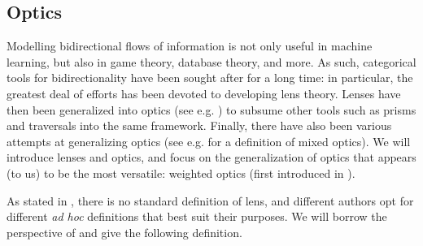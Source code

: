 \documentclass[12pt,a4paper,openright,twoside]{report}
\theoremstyle{plain}
\theoremstyle{definition}
\begin{document}
\subsection{Optics}

Modelling bidirectional flows of information is not only useful in machine learning, but also in game theory, database theory, and more. As such, categorical tools for bidirectionality have been sought after for a long time: in particular, the greatest deal of efforts has been devoted to developing lens theory. Lenses have then been generalized into optics (see e.g. \cite{riley2018categories}) to subsume other tools such as prisms and traversals into the same framework. Finally, there have also been various attempts at generalizing optics (see e.g. \cite{clarke2024profunctor} for a definition of mixed optics). We will introduce lenses and optics, and focus on the generalization of optics that appears (to us) to be the most versatile: weighted optics (first introduced in \cite{gavranovic2024fundamental}). 


As stated in \cite{gavranovic2024fundamental}, there is no standard definition of lens, and different authors opt for different \textit{ad hoc} definitions that best suit their purposes. We will borrow the perspective of \cite{cruttwell2022categorical} and give the following definition.
\end{document}
